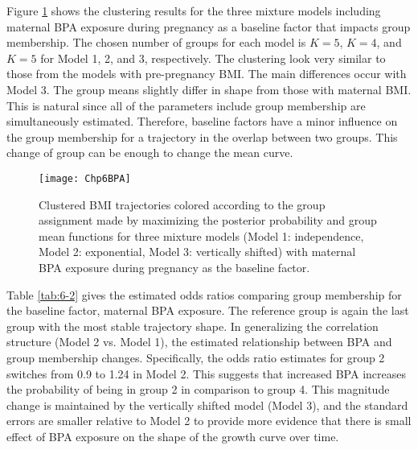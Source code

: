 Figure \ref{fig:6-2} shows the clustering results for the three mixture models including maternal BPA exposure during pregnancy as a baseline factor that impacts group membership. The chosen number of groups for each model is $K = 5$, $K=4$, and $K=5$ for Model 1, 2, and 3, respectively. The clustering look very similar to those from the models with pre-pregnancy BMI. The main differences occur with Model 3. The group means slightly differ in shape from those with maternal BMI. This is natural since all of the parameters include group membership are simultaneously estimated. Therefore, baseline factors have a minor influence on the group membership for a trajectory in the overlap between two groups. This change of group can be enough to change the mean curve.

\begin{figure}[ht]
\centering
\texttt{[image: Chp6BPA]}
\caption{Clustered BMI trajectories colored according to the group assignment made by maximizing the posterior probability and group mean functions for three mixture models (Model 1: independence, Model 2: exponential, Model 3: vertically shifted) with maternal BPA exposure during pregnancy as the baseline factor.}
\label{fig:6-2}
\end{figure}

Table \ref{tab:6-2} gives the estimated odds ratios comparing group membership for the baseline factor, maternal BPA exposure. The reference group is again the last group with the most stable trajectory shape. In generalizing the correlation structure (Model 2 vs. Model 1), the estimated relationship between BPA and group membership changes. Specifically, the odds ratio estimates for group 2 switches from 0.9 to 1.24 in Model 2. This suggests that increased BPA increases the probability of being in group 2 in comparison to group 4. This magnitude change is maintained by the vertically shifted model (Model 3), and the standard errors are smaller relative to Model 2 to provide more evidence that there is small effect of BPA exposure on the shape of the growth curve over time. 

